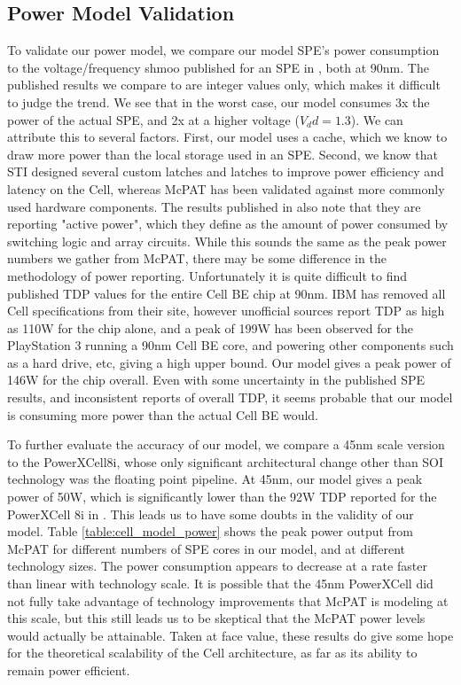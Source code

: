 \documentclass{sig-alternate-05-2015}
\begin{document}
\subsection{Power Model Validation}

To validate our power model, we compare our model SPE's power consumption to the voltage/frequency shmoo published for an SPE in \cite{flachs2006microarchitecture}, both at 90nm. The published results we compare to are integer values only, which makes it difficult to judge the trend. We see that in the worst case, our model consumes 3x the power of the actual SPE, and 2x at a higher voltage ($V_dd = 1.3$). We can attribute this to several factors. First, our model uses a cache, which we know to draw more power than the local storage used in an SPE. Second, we know that STI designed several custom latches and latches \cite{pham2005design} to improve power efficiency and latency on the Cell, whereas McPAT has been validated against more commonly used hardware components. The results published in \cite{flachs2006microarchitecture} also note that they are reporting "active power", which they define as the amount of power consumed by switching logic and array circuits. While this sounds the same as the peak  power numbers we gather from McPAT, there may be some difference in the methodology of power reporting. Unfortunately it is quite difficult to find published TDP values for the entire Cell BE chip at 90nm. IBM has removed all Cell specifications from their site, however unofficial sources report TDP as high as 110W for the chip alone, and a peak of 199W has been observed for the PlayStation 3 running a 90nm Cell BE core, and powering other components such as a hard drive, etc, giving a high upper bound. Our model gives a peak power of 146W for the chip overall. Even with some uncertainty in the published SPE results, and inconsistent reports of overall TDP, it seems probable that our model is consuming more power than the actual Cell BE would.

To further evaluate the accuracy of our model, we compare a 45nm scale version to the PowerXCell8i, whose only significant architectural change other than SOI technology was the floating point pipeline. At 45nm, our model gives a peak power of 50W, which is significantly lower than the 92W TDP reported for the PowerXCell 8i in \cite{powerxcell}. This leads us to have some doubts in the validity of our model. Table \ref{table:cell_model_power} shows the peak power output from McPAT for different numbers of SPE cores in our model, and at different technology sizes. The power consumption appears to decrease at a rate faster than linear with technology scale. It is possible that the 45nm PowerXCell did not fully take advantage of technology improvements that McPAT is modeling at this scale, but this still leads us to be skeptical that the McPAT power levels would actually be attainable. Taken at face value, these results do give some hope for the theoretical scalability of the Cell architecture, as far as its ability to remain power efficient.
\end{document}
